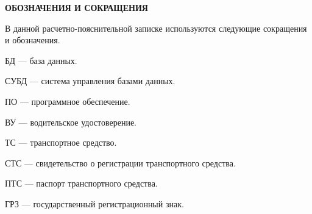\begin{center}
    \textbf{ОБОЗНАЧЕНИЯ И СОКРАЩЕНИЯ}
\end{center}

В данной расчетно-пояснительной записке используются следующие сокращения и обозначения.

\begin{description}[leftmargin=0pt]
	\item \noindent БД --- база данных.
	\item \noindent СУБД --- система управления базами данных.
	\item \noindent ПО --- программное обеспечение.
	\item \noindent ВУ --- водительское удостоверение.
	\item \noindent ТС --- транспортное средство.
	\item \noindent СТС ---  свидетельство о регистрации транспортного средства.
	\item \noindent ПТС --- паспорт транспортного средства.
	\item \noindent ГРЗ --- государственный регистрационный знак.
\end{description}